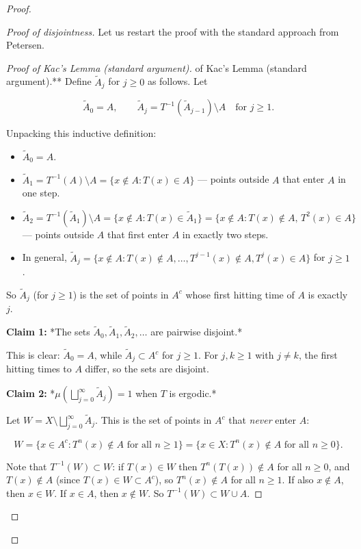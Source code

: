 \begin{proof}
\begin{proof}[Proof of disjointness]
Let us restart the proof with the standard approach from Petersen.

\begin{proof}[Proof of Kac's Lemma (standard argument)]
of Kac's Lemma (standard argument).** Define $\widetilde{A}_j$ for $j \ge 0$ as follows. Let

\[
\widetilde{A}_0 = A, \qquad \widetilde{A}_j = T^{-1}(\widetilde{A}_{j-1}) \setminus A \quad \text{for } j \ge 1.
\]

Unpacking this inductive definition:

\begin{itemize}[nosep]
  \item $\widetilde{A}_0 = A$.
  \item $\widetilde{A}_1 = T^{-1}(A) \setminus A = \{x \notin A : T(x) \in A\}$ --- points outside $A$ that enter $A$ in one step.
  \item $\widetilde{A}_2 = T^{-1}(\widetilde{A}_1) \setminus A = \{x \notin A : T(x) \in \widetilde{A}_1\} = \{x \notin A : T(x) \notin A, \, T^2(x) \in A\}$ --- points outside $A$ that first enter $A$ in exactly two steps.
  \item In general, $\widetilde{A}_j = \{x \notin A : T(x) \notin A, \ldots, T^{j-1}(x) \notin A, T^j(x) \in A\}$ for $j \ge 1$.
\end{itemize}

So $\widetilde{A}_j$ (for $j \ge 1$) is the set of points in $A^c$ whose first hitting time of $A$ is exactly $j$.

\textbf{Claim 1:} *The sets $\widetilde{A}_0, \widetilde{A}_1, \widetilde{A}_2, \ldots$ are pairwise disjoint.*

This is clear: $\widetilde{A}_0 = A$, while $\widetilde{A}_j \subset A^c$ for $j \ge 1$. For $j, k \ge 1$ with $j \ne k$, the first hitting times to $A$ differ, so the sets are disjoint.

\textbf{Claim 2:} *$\mu\!\left(\bigsqcup_{j=0}^\infty \widetilde{A}_j\right) = 1$ when $T$ is ergodic.*

Let $W = X \setminus \bigsqcup_{j=0}^\infty \widetilde{A}_j$. This is the set of points in $A^c$ that \textit{never} enter $A$:

\[
W = \{x \in A^c : T^n(x) \notin A \text{ for all } n \ge 1\} = \{x \in X : T^n(x) \notin A \text{ for all } n \ge 0\}.
\]

Note that $T^{-1}(W) \subset W$: if $T(x) \in W$ then $T^n(T(x)) \notin A$ for all $n \ge 0$, and $T(x) \notin A$ (since $T(x) \in W \subset A^c$), so $T^n(x) \notin A$ for all $n \ge 1$. If also $x \notin A$, then $x \in W$. If $x \in A$, then $x \notin W$. So $T^{-1}(W) \subset W \cup A$.


\end{proof}
\end{proof}
\end{proof}
